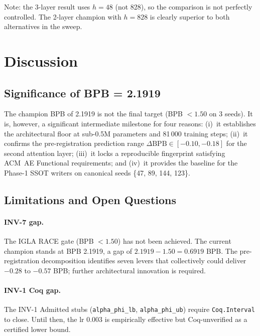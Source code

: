 Note: the 3-layer result uses $h = 48$ (not 828), so the comparison is not
perfectly controlled.  The 2-layer champion with $h = 828$ is clearly
superior to both alternatives in the sweep.

\section{Discussion}
\label{sec:ch24-discussion}

\subsection{Significance of BPB = 2.1919}
\label{subsec:ch24-bpb-significance}

The champion BPB of 2.1919 is not the final target (BPB $< 1.50$ on 3 seeds).
It is, however, a significant intermediate milestone for four reasons:
(i)~it establishes the architectural floor at sub-0.5M parameters and 81\,000
training steps;
(ii)~it confirms the pre-registration prediction range
$\Delta\mathrm{BPB} \in [-0.10, -0.18]$ for the second attention layer;
(iii)~it locks a reproducible fingerprint satisfying ACM~AE Functional
requirements; and
(iv)~it provides the baseline for the Phase-1 SSOT writers on canonical seeds
\{47, 89, 144, 123\}.

\subsection{Limitations and Open Questions}
\label{subsec:ch24-limitations}

\paragraph{INV-7 gap.}
The IGLA RACE gate (BPB $< 1.50$) has not been achieved.  The current champion
stands at BPB 2.1919, a gap of $2.1919 - 1.50 = 0.6919$ BPB.  The
pre-registration decomposition \cite{trios_gate_preregistration} identifies seven
levers that collectively could deliver $-0.28$ to $-0.57$ BPB; further
architectural innovation is required.

\paragraph{INV-1 Coq gap.}
The INV-1 Admitted stubs (\texttt{alpha\_phi\_lb}, \texttt{alpha\_phi\_ub})
require \texttt{Coq.Interval} to close.  Until then, the lr 0.003 is
empirically effective but Coq-unverified as a certified lower bound.

